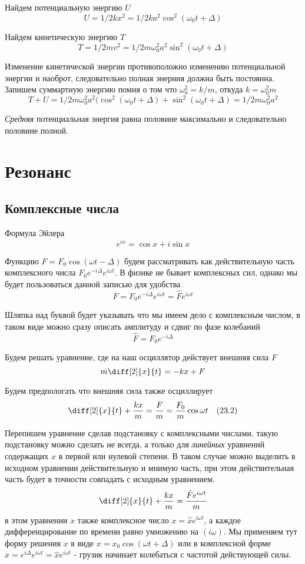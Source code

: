 \documentclass[12pt]{article}
\begin{document}
Найдем потенциальную энергию $U$
\[
    U = 1/2kx^2 = 1/2k a^2 \cos^2(\omega_0t+\Delta)
\]

Найдем кинетическую энергию $T$
\[
    T = 1/2mv^2 = 1/2 m \omega_0^2 a^2 \sin^2(\omega_0t+\Delta)
\]

Изменение кинетической энергии противоположно изменению потенциальной энергии и наоброт, следовательно полная энерния должна быть постоянна. Запишем суммартную энергию помня о том что $\omega_0^2=k/m$, откуда $k=\omega_0^2 m$
\[
    T+U = 1/2 m \omega_0^2 a^2 (\cos^2(\omega_0t+\Delta) + \sin^2(\omega_0t+\Delta) = 1/2 m \omega_0^2 a^2
\]

\textit{Средняя} потенциальная энергия равна половине максимально и следовательно половине полной.

\section{Резонанс}

\subsection{Комплексные числа}

Формула Эйлера
\[
    e^{ix}=\cos x+i\sin x
\]

Функцию $F=F_0 \cos(\omega t-\Delta)$ будем рассматривать как действительную часть комплексного числа $F_0 e^{-i \Delta} e^{i \omega t}$. В физике не бывает комплексных сил, однако мы будет пользоваться данной записью для удобства
\[
    F=F_0 e^{-i \Delta} e^{i \omega t} = \hat{F} e^{i \omega t}
\]

Шляпка над буквой будет указывать что мы имеем дело с комплексным числом, в таком виде можно сразу описать амплитуду и сдвиг по фазе колебаний
\[
    \hat{F}=F_0 e^{-i \Delta}
\]

Будем решать уравнение, где на наш осциллятор действует внешняя сила $F$
\[
    m\diff[2]{x}{t}=-kx + F
\]

Будем предпологать что внешняя сила также осциллирует
\[
    \diff[2]{x}{t}+\frac{kx}{m}=\frac{F}{m}=\frac{F_0}{m} \cos\omega t \quad (23.2)
\]


Перепишем уравнение сделав подстановку с комплексными числами, такую подстановку можно сделать не всегда, а только для \textit{линейных} уравнений содержащих $x$ в первой или нулевой степени. В таком случае можно выделить в исходном уравнении действительную и мнимую часть, при этом действительная часть будет в точности совпадать с исходным уравнением.
\[
    \diff[2]{x}{t}+\frac{kx}{m}=\frac{\hat{F} e^{i \omega t}}{m}
\]
в этом уравнении $x$ также комплексное число $x=\hat{x} e^{i \omega t}$, а каждое дифференцирование по времени равно умножению на $(i \omega)$. Мы применяем тут форму решения $x$ в виде $x=x_0\cos(\omega t+\Delta)$ или в комплексной форме $x=e^{i \Delta} e^{i \omega t} = \hat{x} e^{i \omega t}$ - грузик начинает колебаться с частотой действующей силы.
\end{document}
